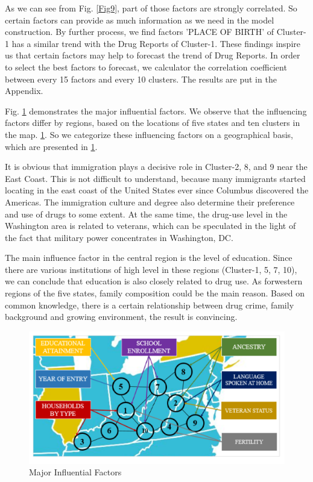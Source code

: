 \documentclass[11pt]{article}
\begin{document}
As we can see from Fig. \ref{Fig9}, part of those factors are strongly correlated. So certain factors can provide as much information as we need in the model construction. By further process, we find factors 'PLACE OF BIRTH' of Cluster-1 has a similar trend with the Drug Reports of Cluster-1. These findings inspire us that certain factors may help to forecast the trend of Drug Reports. In order to select the best factors to forecast, we calculator the correlation coefficient between every 15 factors and every 10 clusters. The results are put in the Appendix.

Fig. \ref{Fig11} demonstrates the major influential factors. We observe that the influencing factors differ by regions, based on the locations of five states and ten clusters in the map. \ref{Fig11}. So we categorize these influencing factors on a geographical basis, which are presented in \ref{Fig11}.

It is obvious that immigration plays a decisive role in Cluster-2, 8, and 9 near the East Coast. This is not difficult to understand, because many immigrants started locating in the east coast of the United States ever since Columbus discovered the Americas. The immigration culture and degree also determine their preference and use of drugs to some extent. At the same time, the drug-use level in the Washington area is related to veterans, which can be speculated in the light of the fact that military power concentrates in Washington, DC. 

The main influence factor in the central region is the level of education. Since there are various institutions of high level in these regions (Cluster-1, 5, 7, 10), we can conclude that education is also closely related to drug use. As forwestern regions of the five states, family composition could be the main reason. Based on common knowledge, there is a certain relationship between drug crime, family background and growing environment, the result is convincing.

\begin{figure}[H]
	\centering
	\includegraphics[scale=0.7]{./figures/11.png}
	\caption{Major Influential Factors}
	\label{Fig11}
\end{figure}
\end{document}
